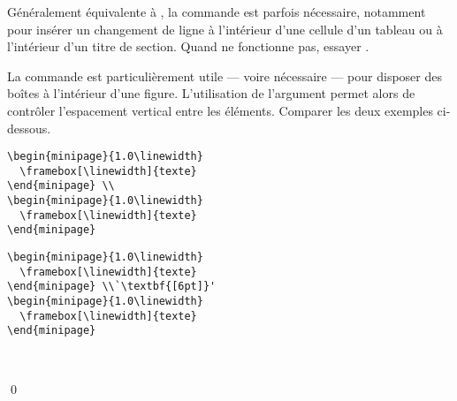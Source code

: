 Généralement équivalente à {\bs\bs}, la commande \cmd{\newline} est
parfois nécessaire, notamment pour insérer un changement de ligne à
l'intérieur d'une cellule d'un tableau ou à l'intérieur d'un titre de
section. Quand {\bs\bs} ne fonctionne pas, essayer
\cmdprint{\newline}.

\begin{exemple}
  La commande {\bs\bs} est particulièrement utile --- voire nécessaire
  --- pour disposer des boîtes à l'intérieur d'une figure.
  L'utilisation de l'argument  permet alors de
  contrôler l'espacement vertical entre les éléments. Comparer les
  deux exemples ci-dessous.
  \begin{demo}
    \begin{texample}[0.55\linewidth]
\begin{lstlisting}
\begin{minipage}{1.0\linewidth}
  \framebox[\linewidth]{texte}
\end{minipage} \\
\begin{minipage}{1.0\linewidth}
  \framebox[\linewidth]{texte}
\end{minipage}
\end{lstlisting}
      \producing
      \begin{minipage}{1.0\linewidth}
      \end{minipage}
      \begin{minipage}{1.0\linewidth}
      \end{minipage}
    \end{texample}

    \begin{texample}[0.55\linewidth]
\begin{lstlisting}
\begin{minipage}{1.0\linewidth}
  \framebox[\linewidth]{texte}
\end{minipage} \\`\textbf{[6pt]}'
\begin{minipage}{1.0\linewidth}
  \framebox[\linewidth]{texte}
\end{minipage}
\end{lstlisting}
      \producing
      \begin{minipage}{1.0\linewidth}
      \end{minipage} \\[6pt]
      \begin{minipage}{1.0\linewidth}
      \end{minipage}
    \end{texample}
  \end{demo}
  \qed
\end{exemple}

